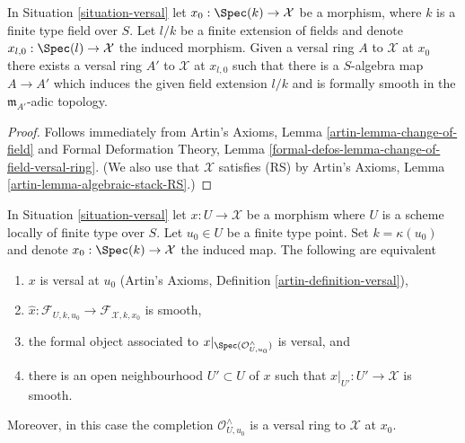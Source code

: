 \begin{lemma}
\label{lemma-versal-ring-field-extension}
In Situation \ref{situation-versal} let $x_0 : \Spec(k) \to \mathcal{X}$
be a morphism, where $k$ is a finite type field over $S$.
Let $l/k$ be a finite extension of fields and denote
$x_{l, 0} : \Spec(l) \to \mathcal{X}$ the induced morphism.
Given a versal ring $A$ to $\mathcal{X}$ at $x_0$ there exists
a versal ring $A'$ to $\mathcal{X}$ at $x_{l, 0}$ such that
there is a $S$-algebra map $A \to A'$ which induces the given
field extension $l/k$ and is formally smooth in the $\mathfrak m_{A'}$-adic
topology.
\end{lemma}

\begin{proof}
Follows immediately from
Artin's Axioms, Lemma \ref{artin-lemma-change-of-field}
and
Formal Deformation Theory, Lemma
\ref{formal-defos-lemma-change-of-field-versal-ring}.
(We also use that $\mathcal{X}$ satisfies (RS) by
Artin's Axioms, Lemma \ref{artin-lemma-algebraic-stack-RS}.)
\end{proof}

\begin{lemma}
\label{lemma-compare-versal-ring-completion}
In Situation \ref{situation-versal} let $x : U \to \mathcal{X}$ be a
morphism where $U$ is a scheme locally of finite type over $S$.
Let $u_0 \in U$ be a finite type point.
Set $k = \kappa(u_0)$ and denote $x_0 : \Spec(k) \to \mathcal{X}$
the induced map. The following are equivalent
\begin{enumerate}
\item $x$ is versal at $u_0$
(Artin's Axioms, Definition \ref{artin-definition-versal}),
\item $\hat x : \mathcal{F}_{U, k, u_0} \to \mathcal{F}_{\mathcal{X}, k, x_0}$
is smooth,
\item the formal object associated to
$x|_{\Spec(\mathcal{O}_{U, u_0}^\wedge)}$ is versal, and
\item there is an open neighbourhood $U' \subset U$ of $x$ such that
$x|_{U'} : U' \to \mathcal{X}$ is smooth.
\end{enumerate}
Moreover, in this case the completion $\mathcal{O}_{U, u_0}^\wedge$
is a versal ring to $\mathcal{X}$ at $x_0$.
\end{lemma}


